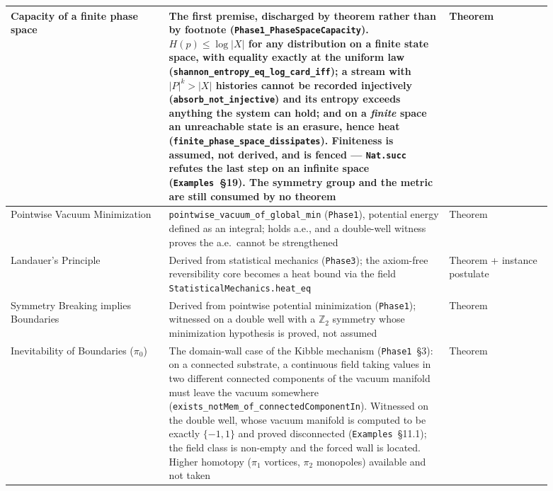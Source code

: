\documentclass{article}
\begin{document}
\begin{longtable}{|>{\raggedright\arraybackslash}p{0.26\linewidth}|>{\raggedright\arraybackslash}p{0.46\linewidth}|>{\raggedright\arraybackslash}p{0.17\linewidth}|}
Capacity of a finite phase space & The first premise, discharged by theorem rather than by footnote (\nolinkurl{Phase1_PhaseSpaceCapacity}). $H(p) \le \log|X|$ for any distribution on a finite state space, with equality exactly at the uniform law (\nolinkurl{shannon_entropy_eq_log_card_iff}); a stream with $|P|^k > |X|$ histories cannot be recorded injectively (\nolinkurl{absorb_not_injective}) and its entropy exceeds anything the system can hold; and on a \emph{finite} space an unreachable state is an erasure, hence heat (\nolinkurl{finite_phase_space_dissipates}). Finiteness is assumed, not derived, and is fenced --- \texttt{Nat.succ} refutes the last step on an infinite space (\texttt{Examples}~\S19). The symmetry group and the metric are still consumed by no theorem & Theorem \\ \hline
Pointwise Vacuum Minimization & \nolinkurl{pointwise_vacuum_of_global_min} (\texttt{Phase1}), potential energy defined as an integral; holds a.e., and a double-well witness proves the a.e.\ cannot be strengthened & Theorem \\ \hline
Landauer's Principle & Derived from statistical mechanics (\texttt{Phase3}); the axiom-free reversibility core becomes a heat bound via the field \nolinkurl{StatisticalMechanics.heat_eq} & Theorem + instance postulate \\ \hline
Symmetry Breaking implies Boundaries & Derived from pointwise potential minimization (\texttt{Phase1}); witnessed on a double well with a $\mathbb{Z}_2$ symmetry whose minimization hypothesis is proved, not assumed & Theorem \\ \hline
Inevitability of Boundaries ($\pi_0$) & The domain-wall case of the Kibble mechanism (\texttt{Phase1}~\S3): on a connected substrate, a continuous field taking values in two different connected components of the vacuum manifold must leave the vacuum somewhere (\nolinkurl{exists_notMem_of_connectedComponentIn}). Witnessed on the double well, whose vacuum manifold is computed to be exactly $\{-1,1\}$ and proved disconnected (\texttt{Examples}~\S11.1); the field class is non-empty and the forced wall is located. Higher homotopy ($\pi_1$ vortices, $\pi_2$ monopoles) available and not taken & Theorem \\ \hline

\end{longtable}
\end{document}
